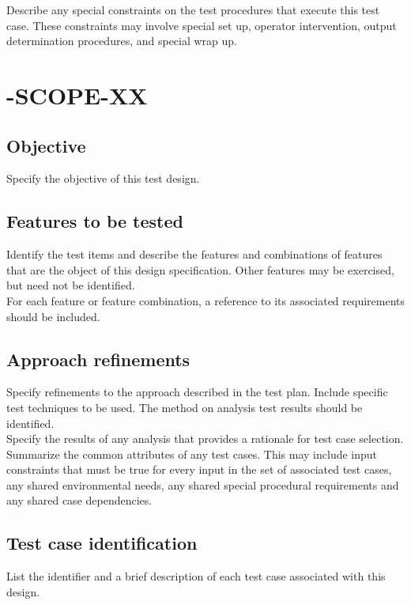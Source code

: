 \documentclass[DM,lsstdraft,STS,toc]{lsstdoc}
\begin{document}
Describe any special constraints on the test procedures that execute this test case. These constraints may involve special set
up, operator intervention, output determination procedures, and special wrap up.


\section{\product-SCOPE-XX \label{sect:designid}}

\subsection{Objective \label{sect:designobj}}
Specify the objective of this test design.

\subsection{Features to be tested \label{sect:totest}}
Identify the test items and describe the features and combinations of features that are the object of this design
specification. Other features may be exercised, but need not be identified.\\
For each feature or feature combination, a reference to its associated requirements should be included.

\subsection{Approach refinements \label{sect:approach}}
Specify refinements to the approach described in the test plan. Include specific test techniques to be used.
The method on analysis test results should be identified.\\
Specify the results of any analysis that provides a rationale for test case selection.\\
Summarize the common attributes of any test cases. This may include input constraints that must be true for every input
in the set of associated test cases, any shared environmental needs, any shared special procedural requirements and any
shared case dependencies.

\subsection{Test case identification \label{sect:testcaselist}}
List the identifier and a brief description of each test case associated with this design.
\end{document}
